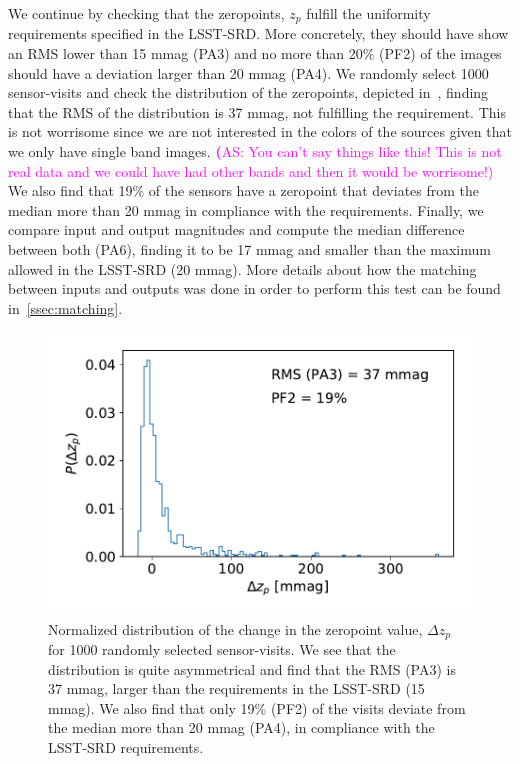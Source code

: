 \documentclass[twocolumn]{aastex62}
\newcommand{\as}[1]{{\textcolor{magenta}{{\textbf (AS: #1)}}}}
\begin{document}
We continue by checking that the zeropoints, $z_{p}$ fulfill the uniformity requirements specified in the LSST-SRD. More concretely, they should have show an RMS lower than 15 mmag (PA3) and no more than 20\% (PF2) of the images should have a deviation larger than 20 mmag (PA4). We randomly select 1000 sensor-visits and check the distribution of the zeropoints, depicted in~, finding that the RMS of the distribution is 37 mmag, not fulfilling the requirement. This is not worrisome since we are not interested in the colors of the sources given that we only have single band images. \as{You can't say things like this! This is not real data and we could have had other bands and then it would be worrisome!} We also find that 19\% of the sensors have a zeropoint that deviates from the median more than 20 mmag in compliance with the requirements. Finally, we compare input and output magnitudes and compute the median difference between both (PA6), finding it to be 17 mmag and smaller than the maximum allowed in the LSST-SRD (20 mmag). More details about how the matching between inputs and outputs was done in order to perform this test can be found in~\ref{ssec:matching}.

\begin{figure}
\centering
\includegraphics[width=0.9\columnwidth]{PA234.pdf}
\caption{Normalized distribution of the change in the zeropoint value, $\Delta z_{p}$ for 1000 randomly selected sensor-visits. We see that the distribution is quite asymmetrical and find that the RMS (PA3) is 37 mmag, larger than the requirements in the LSST-SRD (15 mmag). We also find that only 19\% (PF2) of the visits deviate from the median more than 20 mmag (PA4), in compliance with the LSST-SRD requirements.}
\label{fig:PA34}
\end{figure}
\end{document}

